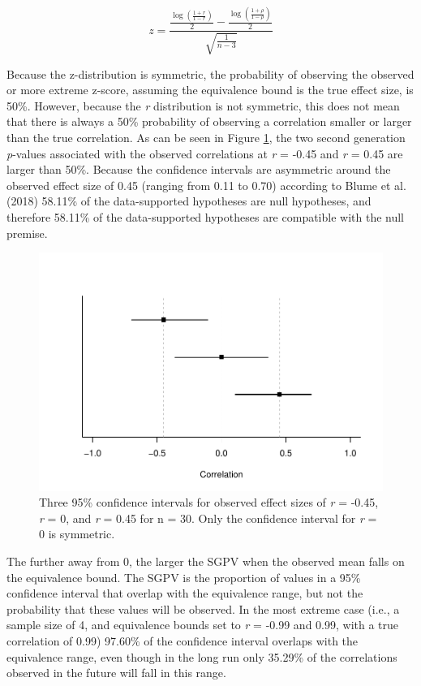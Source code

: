 \documentclass[,man,floatsintext]{apa6}
\begin{document}
\[
z = \frac{\frac{\log(\frac{1 + r}{ 1 - r})}{2} - \frac{\log(\frac{1 + \rho}{ 1 - \rho})}{2}}{\sqrt{\frac{1}{n-3}}}
\]

Because the z-distribution is symmetric, the probability of observing the observed or more extreme z-score, assuming the equivalence bound is the true effect size, is 50\%. However, because the \emph{r} distribution is not symmetric, this does not mean that there is always a 50\% probability of observing a correlation smaller or larger than the true correlation. As can be seen in Figure \ref{fig:TOSTSGPV12}, the two second generation \emph{p}-values associated with the observed correlations at \emph{r} = -0.45 and \emph{r} = 0.45 are larger than 50\%. Because the confidence intervals are asymmetric around the observed effect size of 0.45 (ranging from 0.11 to 0.70) according to Blume et al. (2018) 58.11\% of the data-supported hypotheses are null hypotheses, and therefore 58.11\% of the data-supported hypotheses are compatible with the null premise.

\begin{figure}
\centering
\includegraphics{manuscript.R2_files/figure-latex/TOSTSGPV12-1.pdf}
\caption{\label{fig:TOSTSGPV12}Three 95\% confidence intervals for observed effect sizes of \emph{r} = -0.45, \emph{r} = 0, and \emph{r} = 0.45 for n = 30. Only the confidence interval for \emph{r} = 0 is symmetric.}
\end{figure}

The further away from 0, the larger the SGPV when the observed mean falls on the equivalence bound. The SGPV is the proportion of values in a 95\% confidence interval that overlap with the equivalence range, but not the probability that these values will be observed. In the most extreme case (i.e., a sample size of 4, and equivalence bounds set to \emph{r} = -0.99 and 0.99, with a true correlation of 0.99) 97.60\% of the confidence interval overlaps with the equivalence range, even though in the long run only 35.29\% of the correlations observed in the future will fall in this range.
\end{document}

